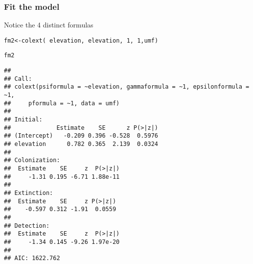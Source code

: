 \documentclass[color=usenames,dvipsnames]{beamer}\usepackage[]{graphicx}\usepackage[]{color}
\makeatletter
\newcommand{\hlnum}[1]{\textcolor[rgb]{0.69,0.494,0}{#1}}%
\newcommand{\hlopt}[1]{\textcolor[rgb]{0,0,0}{#1}}%
\newcommand{\hlstd}[1]{\textcolor[rgb]{0,0,0}{#1}}%
\newcommand{\hlkwb}[1]{\textcolor[rgb]{0,0.341,0.682}{#1}}%
\newcommand{\hlkwd}[1]{\textcolor[rgb]{0.004,0.004,0.506}{#1}}%
\newenvironment{kframe}{%
 \def\at@end@of@kframe{}%
 \ifinner\ifhmode%
  \def\at@end@of@kframe{\end{minipage}}%
  \begin{minipage}{\columnwidth}%
 \fi\fi%
 \def\FrameCommand##1{\hskip\@totalleftmargin \hskip-\fboxsep
 \colorbox{shadecolor}{##1}\hskip-\fboxsep
     \hskip-\linewidth \hskip-\@totalleftmargin \hskip\columnwidth}%
 \MakeFramed {\advance\hsize-\width
   \@totalleftmargin\z@ \linewidth\hsize
   \@setminipage}}%
 {\par\unskip\endMakeFramed%
 \at@end@of@kframe}
\newenvironment{knitrout}{}{} %
\makeatother
\begin{document}
\begin{frame}[fragile]
  \frametitle{Fit the model}
  \footnotesize
  Notice the 4 distinct formulas
\begin{knitrout}\tiny
{}\color{fgcolor}\begin{kframe}
\begin{alltt}
\hlstd{fm2} \hlkwb{<-} \hlkwd{colext}\hlstd{(}\hlopt{~}\hlstd{elevation,}\hlopt{~}\hlstd{elevation,}\hlopt{~}\hlnum{1}\hlstd{,}\hlopt{~}\hlnum{1}\hlstd{, umf)}
\end{alltt}


{\ttfamily\noindent\bfseries\color{errorcolor}{\#\# Error in cbind(X.gam, X.eps): number of rows of matrices must match (see arg 2)}}\begin{alltt}
\hlstd{fm2}
\end{alltt}
\begin{verbatim}
## 
## Call:
## colext(psiformula = ~elevation, gammaformula = ~1, epsilonformula = ~1, 
##     pformula = ~1, data = umf)
## 
## Initial:
##             Estimate    SE      z P(>|z|)
## (Intercept)   -0.209 0.396 -0.528  0.5976
## elevation      0.782 0.365  2.139  0.0324
## 
## Colonization:
##  Estimate    SE     z  P(>|z|)
##     -1.31 0.195 -6.71 1.88e-11
## 
## Extinction:
##  Estimate    SE     z P(>|z|)
##    -0.597 0.312 -1.91  0.0559
## 
## Detection:
##  Estimate    SE     z  P(>|z|)
##     -1.34 0.145 -9.26 1.97e-20
## 
## AIC: 1622.762
\end{verbatim}
\end{kframe}
\end{knitrout}
\end{frame}











\end{document}
